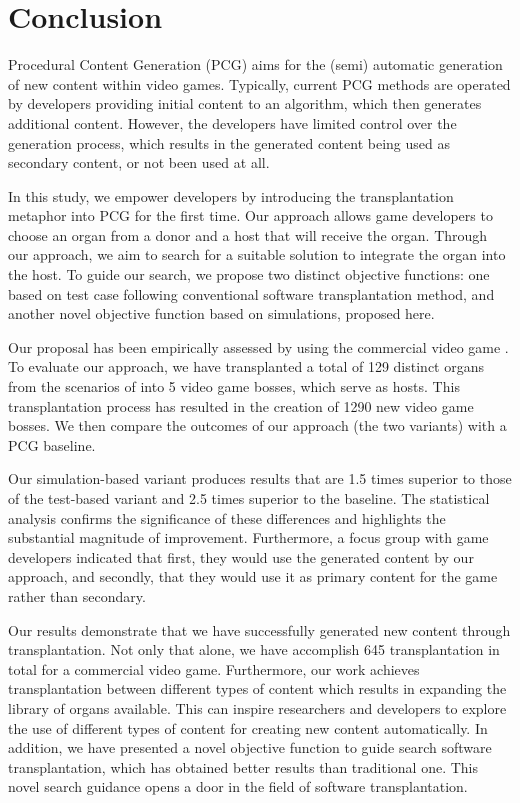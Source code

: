 \section{Conclusion}
\label{sec:Conclusion}

Procedural Content Generation (PCG) aims for the (semi) automatic generation of new content within video games.  Typically, current PCG methods are operated by developers providing initial content to an algorithm, which then generates additional content. However, the developers have limited control over the generation process, which results in the generated content being used as secondary content, or not been used at all.

In this study, we empower developers by introducing the transplantation metaphor into PCG for the first time. Our approach allows game developers to choose an organ from a donor and a host that will receive the organ. Through our approach, we aim to search for a suitable solution to integrate the organ into the host. To guide our search, we propose two distinct objective functions: one based on test case following conventional software transplantation method, and another novel objective function based on simulations, proposed here.

Our proposal has been empirically assessed by using the commercial video game \CaseStudy{}. To evaluate our approach, we have transplanted a total of 129 distinct organs from the scenarios of \CaseStudy{} into 5 video game bosses, which serve as hosts. This transplantation process has resulted in the creation of 1290 new video game bosses. We then compare the outcomes of our approach (the two variants) with a PCG baseline.

Our simulation-based variant produces results that are 1.5 times superior to those of the test-based variant and 2.5 times superior to the baseline. The statistical analysis confirms the significance of these differences and highlights the substantial magnitude of improvement.
Furthermore, a focus group with game developers indicated that first, they would use the generated content by our approach, and secondly, that they would use it as primary content for the game rather than secondary.

Our results demonstrate that we have successfully generated new content through transplantation. Not only that alone, we have accomplish 645 transplantation in total for a commercial video game. Furthermore, our work achieves transplantation between different types of content which results in expanding the library of organs available. This can inspire researchers and developers to explore the use of different types of content for creating new content automatically. 
In addition, we have presented a novel objective function to guide search software transplantation, which has obtained better results than traditional one. This novel search guidance opens a door in the field of software transplantation.


